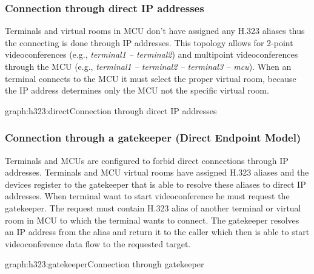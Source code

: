 \documentclass[a4paper]{report}
\begin{document}
\subsubsection{Connection through direct IP addresses}

Terminals and virtual rooms in MCU don't have assigned any H.323 aliases thus the connecting is done through IP addresses. This topology allows for 2-point videoconferences (e.g., \emph{terminal1 -- terminal2}) and multipoint videoconferences through the MCU (e.g., \emph{terminal1 -- terminal2 -- terminal3 -- mcu}). When an terminal connects to the MCU it must select the proper virtual room, because the IP address determines only the MCU not the specific virtual room.

\begin{Graph}{graph:h323:direct}{Connection through direct IP addresses}
  
  
\end{Graph}

\subsubsection{Connection through a gatekeeper (Direct Endpoint Model)}

Terminals and MCUs are configured to forbid direct connections through IP addresses. Terminals and MCU virtual rooms have assigned H.323 aliases and the devices register to the gatekeeper that is able to resolve these aliases to direct IP addresses. When terminal want to start videoconference he must request the gatekeeper. The request must contain H.323 alias of another terminal or virtual room in MCU to which the terminal wants to connect. The gatekeeper resolves an IP address from the alias and return it to the caller which then is able to start videoconference data flow to the requested target.

\begin{Graph}{graph:h323:gatekeeper}{Connection through gatekeeper}{}
  
  
\end{Graph}
\end{document}
